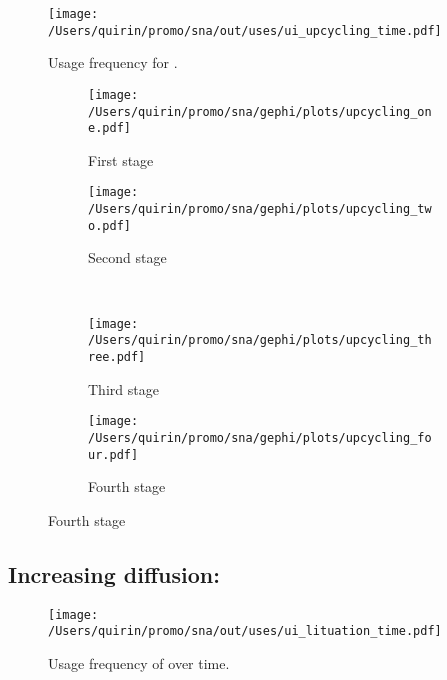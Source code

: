 \documentclass[
  a4paper,
  ]{scrartcl}
\begin{document}
    \begin{figure}[H]
      \caption{Usage frequency for .}
      \centering
      \texttt{[image: /Users/quirin/promo/sna/out/uses/ui\_upcycling\_time.pdf]}
    \end{figure}

    \begin{figure}[H]
      \caption{Social network of diffusion for  over time.}
      \centering
      \begin{subfigure}{.45\linewidth}
        \caption{First stage}
        \centering
        \texttt{[image: /Users/quirin/promo/sna/gephi/plots/upcycling\_one.pdf]}
      \end{subfigure}
      \begin{subfigure}{.45\linewidth}
        \caption{Second stage}
        \centering
        \texttt{[image: /Users/quirin/promo/sna/gephi/plots/upcycling\_two.pdf]}
      \end{subfigure}\\
      \begin{subfigure}{.45\linewidth}
        \caption{Third stage}
        \centering
        \texttt{[image: /Users/quirin/promo/sna/gephi/plots/upcycling\_three.pdf]}
      \end{subfigure}
      \begin{subfigure}{.45\linewidth}
        \caption{Fourth stage}
        \centering
        \texttt{[image: /Users/quirin/promo/sna/gephi/plots/upcycling\_four.pdf]}
      \end{subfigure}
    \end{figure}

  \subsection{Increasing diffusion: }

    \begin{figure}[H]
      \caption{Usage frequency of  over time.}
      \centering
      \texttt{[image: /Users/quirin/promo/sna/out/uses/ui\_lituation\_time.pdf]}
    \end{figure}
\end{document}
